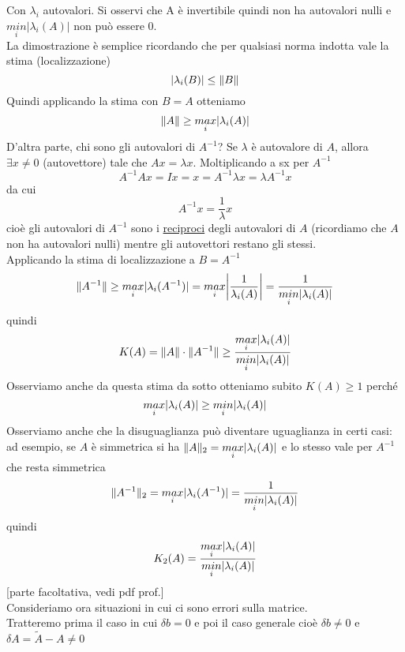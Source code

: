 \documentclass[12pt,a4paper]{article}
\DeclarePairedDelimiter{\abs}{\lvert}{\rvert}
\DeclarePairedDelimiter{\norma}{\lVert}{\rVert}
\begin{document}
Con $\lambda_i$ autovalori. Si osservi che A è invertibile quindi non ha autovalori nulli e $\underset{i}{min}|\lambda_i(A)|$ non può essere 0.\\La dimostrazione è semplice ricordando che per qualsiasi norma indotta vale la stima (localizzazione)
\begin{equation*}
    |\lambda_i(B)|\leq\norma{B}
\end{equation*}
Quindi applicando la stima con $B=A$ otteniamo
\begin{equation*}
    \norma{A}\geq\underset{i}{max}|\lambda_i(A)|
\end{equation*}
D'altra parte, chi sono gli autovalori di $A^{-1}$? Se $\lambda$ è autovalore di $A$, allora $\exists x \neq 0$ (autovettore) tale che $Ax=\lambda x$. Moltiplicando a sx per $A^{-1}$
\begin{equation*}
    A^{-1}Ax=Ix=x=A^{-1}\lambda x=\lambda A^{-1}x
\end{equation*}
da cui
\begin{equation*}
    A^{-1}x=\frac{1}{\lambda}x
\end{equation*}
cioè gli autovalori di $A^{-1}$ sono i \underline{reciproci} degli autovalori di $A$ (ricordiamo che $A$ non ha autovalori nulli) mentre gli autovettori restano gli stessi.\\
Applicando la stima di localizzazione a $B = A^{-1}$
\[
\norma{A^{-1}} \ge \underset{i}{max} \abs{\lambda_i (A^{-1})} = \underset{i}{max} \abs*{\frac{1}{\lambda_i (A)}} = \frac{1}{\underset{i}{min} \abs{\lambda_i(A)}}
\]
quindi
\[
K(A) = \norma{A} \cdot \norma{A^{-1}} \ge \frac{\underset{i}{max} \abs{\lambda_i (A)}}{\underset{i}{min} \abs{\lambda_i (A)}}
\]
Osserviamo anche da questa stima da sotto otteniamo subito $K(A) \ge 1$ perché
\[
\underset{i}{max} \abs{\lambda_i(A)} \ge \underset{i}{min} \abs{\lambda_i(A)}
\]
Osserviamo anche che la disuguaglianza può diventare uguaglianza in certi casi: ad esempio, se $A$ è simmetrica si ha $\norma{A}_2 = \underset{i}{max} \abs{\lambda_i (A)}$ e lo stesso vale per $A^{-1}$ che resta simmetrica
\[
\norma{A^{-1}}_2 = \underset{i}{max} \abs{\lambda_i (A^{-1})} = \frac{1}{\underset{i}{min} \abs{\lambda_i(A)}}
\]
quindi
\[
K_2 (A) = \frac{\underset{i}{max} \abs{\lambda_i (A)}}{\underset{i}{min} \abs{\lambda_i (A)}}
\]
[parte facoltativa, vedi pdf prof.]\\
Consideriamo ora situazioni in cui ci sono errori sulla matrice.\\
Tratteremo prima il caso in cui $\delta b = 0$ e poi il caso generale cioè $\delta b \neq 0$ e $\delta A = \tilde{A} - A \neq 0$\\\\
\end{document}
